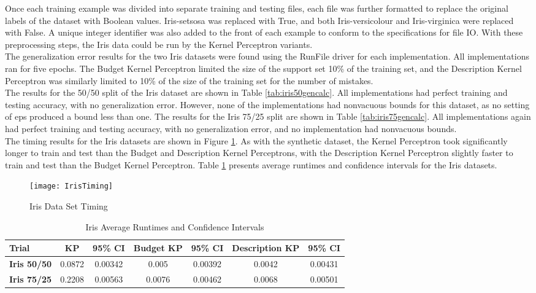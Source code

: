 Once each training example was divided into separate training and testing files, each file was further formatted to replace the original labels of the dataset with Boolean values. Iris-setsosa was replaced with True, and both Iris-versicolour and Iris-virginica were replaced with False. A unique integer identifier was also added to the front of each example to conform to the specifications for file IO. With these preprocessing steps, the Iris data could be run by the Kernel Perceptron variants.
\\The generalization error results for the two Iris datasets were found using the RunFile driver for each implementation. All implementations ran for five epochs. The Budget Kernel Perceptron limited the size of the support set 10\% of the training set, and the Description Kernel Perceptron was similarly limited to 10\% of the size of the training set for the number of mistakes. 
\\The results for the 50/50 split of the Iris dataset are shown in Table \ref{tab:iris50gencalc}. All implementations had perfect training and testing accuracy, with no generalization error. However, none of the implementations had nonvacuous bounds for this dataset, as no setting of eps produced a bound less than one. The results for the Iris 75/25 split are shown in Table \ref{tab:iris75gencalc}. All implementations again had perfect training and testing accuracy, with no generalization error, and no implementation had nonvacuous bounds.
\\The timing results for the Iris datasets are shown in Figure \ref{IrisTiming}. As with the synthetic dataset, the Kernel Perceptron took significantly longer to train and test than the Budget and Description Kernel Perceptrons, with the Description Kernel Perceptron slightly faster to train and test than the Budget Kernel Perceptron. Table \ref{tab:iristabtiming} presents average runtimes and confidence intervals for the Iris datasets.

\begin{figure}[h]\label{IrisTiming}
 \caption{Iris Data Set Timing}
 \begin{center}
  \texttt{[image: IrisTiming]}
 \end{center}
\end{figure}

\begin{table}[h]
 \begin{center}
  \caption{Iris Average Runtimes and Confidence Intervals}
  \label{tab:iristabtiming}
  \begin{tabular}{l|c|c|c|c|c|c}
  \textbf{Trial} & \textbf{KP} & \textbf{95\% CI} & \textbf{Budget KP} & \textbf{95\% CI} & \textbf{Description KP} & \textbf{95\% CI}\\
  \hline
  \textbf{Iris 50/50} & 0.0872 & 0.00342 & 0.005 & 0.00392 & 0.0042 & 0.00431\\
  \textbf{Iris 75/25} & 0.2208 & 0.00563 & 0.0076 & 0.00462 & 0.0068 & 0.00501\\
  \end{tabular}
 \end{center}
\end{table}

